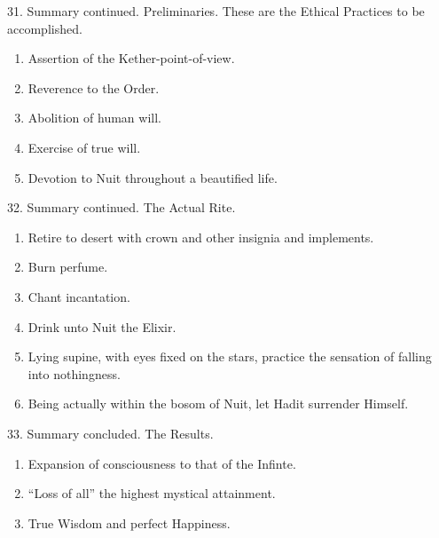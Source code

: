 31. Summary continued. Preliminaries. These are the Ethical Practices to be accomplished.
\begin{enumerate}[leftmargin=4\parindent]
\item Assertion of the Kether-point-of-view.
\item Reverence to the Order.
\item Abolition of human will.
\item Exercise of true will.
\item Devotion to Nuit throughout a beautified life.
\end{enumerate}

32. Summary continued. The Actual Rite.
\begin{enumerate}[leftmargin=4\parindent]
\item Retire to desert with crown and other insignia and implements.
\item Burn perfume.
\item Chant incantation.
\item Drink unto Nuit the Elixir.
\item Lying supine, with eyes fixed on the stars, practice the sensation of falling into nothingness.
\item Being actually within the bosom of Nuit, let Hadit surrender Himself.
\end{enumerate}

33. Summary concluded. The Results.
\begin{enumerate}[leftmargin=4\parindent]
\item Expansion of consciousness to that of the Infinte.
\item \enquote{Loss of all} the highest mystical attainment.
\item True Wisdom and perfect Happiness.
\end{enumerate}

